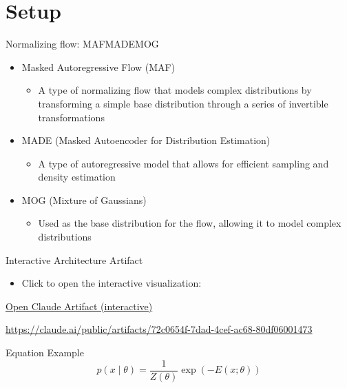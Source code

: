 \documentclass[aspectratio=169]{beamer}
\begin{document}
\section{Setup}
\begin{frame}{Normalizing flow: MAFMADEMOG}
  \begin{itemize}
    \item Masked Autoregressive Flow (MAF) 
    \begin{itemize}
      \item A type of normalizing flow that models complex distributions by transforming a simple base distribution through a series of invertible transformations
    \end{itemize}
    \item MADE (Masked Autoencoder for Distribution Estimation) 
    \begin{itemize}
      \item A type of autoregressive model that allows for efficient sampling and density estimation
    \end{itemize}
    \item MOG (Mixture of Gaussians) 
    \begin{itemize}
      \item Used as the base distribution for the flow, allowing it to model complex distributions
    \end{itemize}
  \end{itemize}

\end{frame}

\begin{frame}{Interactive Architecture Artifact}
  \begin{itemize}
    \item Click to open the interactive visualization:
  \end{itemize}

  \vspace{0.4cm}
  \centering
  \Large
  \href{https://claude.ai/public/artifacts/72c0654f-7dad-4cef-ac68-80df06001473}{Open Claude Artifact (interactive)}

  \vspace{0.5cm}
  \normalsize
  \url{https://claude.ai/public/artifacts/72c0654f-7dad-4cef-ac68-80df06001473}
\end{frame}

\begin{frame}{Equation Example}
  \[
    p(x\mid\theta) = \frac{1}{Z(\theta)}\exp\left(-E(x;\theta)\right)
  \]
\end{frame}
\end{document}
